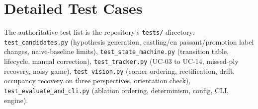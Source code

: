 \chapter{Detailed Test Cases}
The authoritative test list is the repository's \texttt{tests/} directory: \texttt{test\_candidates.py} (hypothesis
generation, castling/en passant/promotion label changes, naive-baseline limits), \texttt{test\_state\_machine.py}
(transition table, lifecycle, manual correction), \texttt{test\_tracker.py} (UC-03 to UC-14, missed-ply recovery, noisy
game), \texttt{test\_vision.py} (corner ordering, rectification, drift, occupancy recovery on three perspectives,
orientation check), \texttt{test\_evaluate\_and\_cli.py} (ablation ordering, determinism, config, CLI, engine).
